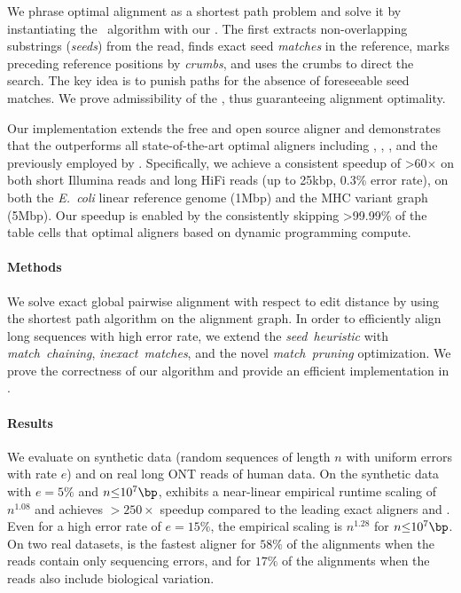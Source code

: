 We phrase optimal alignment as a shortest path problem and solve it by
instantiating the \A~algorithm with our \seedh. The \seedh first extracts
non-overlapping substrings (\emph{seeds}) from the read, finds exact seed
\emph{matches} in the reference, marks preceding reference positions by
\emph{crumbs}, and uses the crumbs to direct the \A search. The key idea is to
punish paths for the absence of foreseeable seed matches. We prove admissibility
of the \seedh, thus guaranteeing alignment optimality.

Our implementation extends the free and open source aligner and demonstrates
that the \seedh outperforms all state-of-the-art optimal aligners including
\graphaligner, \vargas, \pasgal, and the \prefixh previously employed by
\astarix. Specifically, we achieve a consistent speedup of >60$\times$ on both
short Illumina reads and long HiFi reads (up to 25kbp, 0.3\% error rate), on
both the \textit{E.~coli} linear reference genome (1Mbp) and the MHC variant
graph (5Mbp). Our speedup is enabled by the \seedh consistently skipping
>99.99\% of the table cells that optimal aligners based on dynamic programming
compute.

\paragraph{Methods}
We solve exact global pairwise alignment with respect to edit distance by using
the \A shortest path algorithm on the alignment graph. In order to efficiently
align long sequences with high error rate, we extend the \emph{seed~heuristic}
with \emph{match~chaining}, \emph{inexact~matches}, and the novel
\emph{match~pruning} optimization. We prove the correctness of our algorithm and
provide an efficient implementation in \astarpa.
\paragraph{Results}
We evaluate \astarpa on synthetic data (random sequences of length $n$ with
uniform errors with rate $e$) and on real long ONT reads of human data. On the
synthetic data with $e{=}5\%$ and $n{\leq}10^7\bp$, \astarpa exhibits a
near-linear empirical runtime scaling of $n^{1.08}$ and achieves ${>}250\times$
speedup compared to the leading exact aligners \edlib and \wfa. Even for a high
error rate of $e{=}15\%$, the empirical scaling is $n^{1.28}$ for
$n{\leq}10^7\bp$. On two real datasets, \astarpa is the fastest aligner for
$58\%$ of the alignments when the reads contain only sequencing errors, and for
$17\%$ of the alignments when the reads also include biological variation.
